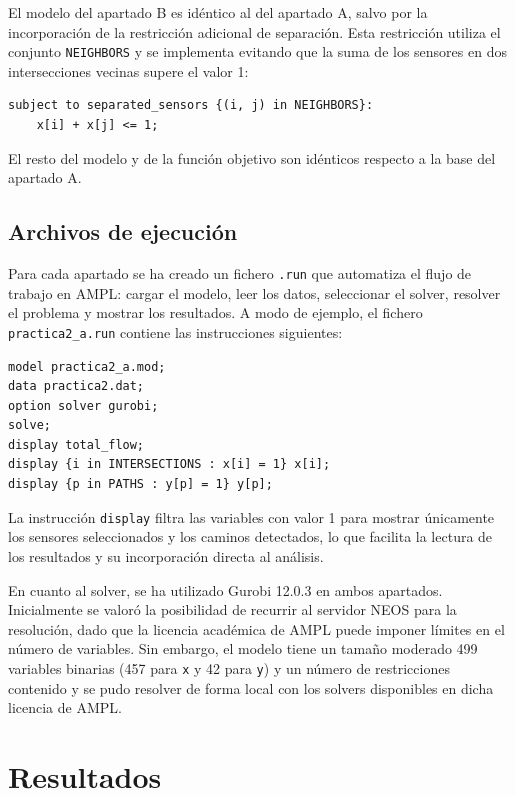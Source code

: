 \documentclass[12pt,a4paper]{article}
\begin{document}
El modelo del apartado B es idéntico al del apartado A, salvo por la incorporación de la restricción adicional de separación. Esta restricción utiliza el conjunto \texttt{NEIGHBORS} y se implementa evitando que la suma de los sensores en dos intersecciones vecinas supere el valor 1:

\begin{lstlisting}[language=ampl]
subject to separated_sensors {(i, j) in NEIGHBORS}:
    x[i] + x[j] <= 1;
\end{lstlisting}

El resto del modelo y de la función objetivo son idénticos respecto a la base del apartado A.

\subsection{Archivos de ejecución}

Para cada apartado se ha creado un fichero \texttt{.run} que automatiza el flujo de trabajo en AMPL: cargar el modelo, leer los datos, seleccionar el solver, resolver el problema y mostrar los resultados. A modo de ejemplo, el fichero \texttt{practica2\_a.run} contiene las instrucciones siguientes:

\begin{lstlisting}[language=ampl,caption={Fichero de ejecución del apartado A}]
model practica2_a.mod;
data practica2.dat;
option solver gurobi;
solve;
display total_flow;
display {i in INTERSECTIONS : x[i] = 1} x[i];
display {p in PATHS : y[p] = 1} y[p];
\end{lstlisting}

La instrucción \texttt{display} filtra las variables con valor 1 para mostrar únicamente los sensores seleccionados y los caminos detectados, lo que facilita la lectura de los resultados y su incorporación directa al análisis.

En cuanto al solver, se ha utilizado Gurobi 12.0.3 en ambos apartados. Inicialmente se valoró la posibilidad de recurrir al servidor NEOS para la resolución, dado que la licencia académica de AMPL puede imponer límites en el número de variables. Sin embargo, el modelo tiene un tamaño moderado 499 variables binarias (457 para \texttt{x} y 42 para \texttt{y}) y un número de restricciones contenido y se pudo resolver de forma local con los solvers disponibles en dicha licencia de AMPL.

\section{Resultados}
\end{document}
